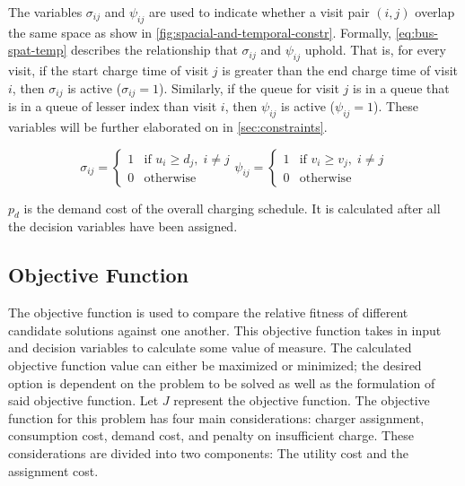 \documentclass[11pt,a4paper,final]{article}
\begin{document}
The variables \(\sigma_{ij}\) and \(\psi_{ij}\) are used to indicate whether a visit pair \((i, j)\) overlap the same space as show in
\ref{fig:spacial-and-temporal-constr}. Formally, \ref{eq:bus-spat-temp} describes the relationship that \(\sigma_{ij}\) and \(\psi_{ij}\)
uphold. That is, for every visit, if the start charge time of visit \(j\) is greater than the end charge time of visit
\(i\), then \(\sigma_{ij}\) is active (\(\sigma_{ij} = 1\)). Similarly, if the queue for visit \(j\) is in a queue that is in a queue of
lesser index than visit \(i\), then \(\psi_{ij}\) is active (\(\psi_{ij} = 1\)). These variables will be further elaborated on in
\ref{sec:constraints}.

\begin{subequations}
\label{eq:bus-spat-temp}
\begin{equation}
  \sigma_{ij} =
  \begin{cases}
    1 & \text{if } u_i \ge d_j, \; i \ne j\\
    0 & \text{otherwise}
  \end{cases}
\end{equation}

\begin{equation}
  \psi_{ij} =
  \begin{cases}
    1 & \text{if } v_i \ge v_j,\; i \ne j\\
    0 & \text{otherwise}
  \end{cases}
\end{equation}
\end{subequations}

\(p_d\) is the demand cost of the overall charging schedule. It is calculated after all the decision variables have been
assigned.

\subsection{Objective Function}
\label{sec:objective-function}
The objective function is used to compare the relative fitness of different candidate solutions against one another.
This objective function takes in input and decision variables to calculate some value of measure. The calculated
objective function value can either be maximized or minimized; the desired option is dependent on the problem to be
solved as well as the formulation of said objective function. Let \(J\) represent the objective function. The objective
function for this problem has four main considerations: charger assignment, consumption cost, demand cost, and penalty
on insufficient charge. These considerations are divided into two components: The utility cost and the assignment cost.
\end{document}
